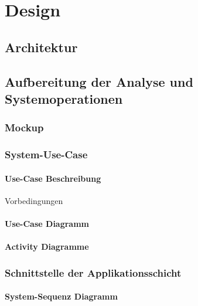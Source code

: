 \chapter{Design}\label{chap:Design}

\section{Architektur}

\section{Aufbereitung der Analyse und Systemoperationen}

\subsection{Mockup}

\subsection{System-Use-Case}

\subsubsection{Use-Case Beschreibung}
\begin{labeling}[:]{Vorbedingungen}
\item [Akteure]
\item [Priorität]
\item [Beschreibung]
\item [Vorbedingungen]
\item [Offene Punkte]
\end{labeling}

\subsubsection{Use-Case Diagramm}

\subsubsection{Activity Diagramme}

\subsection{Schnittstelle der Applikationsschicht}

\subsubsection{System-Sequenz Diagramm}

